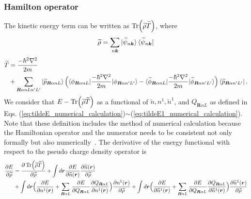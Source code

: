 \documentclass{article}
\begin{document}
\subsubsection{Hamilton operator}
The kinetic energy term can be written as $\Tr (\widetilde{\rho} \widetilde{T})$, where
\begin{align}
  \widetilde{\rho} = \sum_{n\bm{k}} \ket{\widetilde{\psi}_{n\bm{k}}} \bra{\widetilde{\psi}_{n\bm{k}}}
\end{align}
\begin{align}
  \widetilde{T} 
  &=
  \frac{-\hbar^2 \nabla^2}{2m} 
  \nonumber
  \\&+ 
  \sum_{\bm{R}\alpha nL n'L'}
  \ket{\widetilde{p}_{\bm{R}\alpha nL}}
  \Bigl(
    \braket{\phi_{\bm{R}\alpha nL} | \frac{-\hbar^2 \nabla^2}{2m} | \phi_{\bm{R}\alpha n'L'}} 
    - 
    \braket{\widetilde{\phi}_{\bm{R}\alpha nL} | \frac{-\hbar^2 \nabla^2}{2m} | \widetilde{\phi}_{\bm{R}\alpha n'L'}}
  \Bigr)
  \bra{\widetilde{p}_{\bm{R}\alpha n'L'}}.
\end{align}
We consider that $E - \Tr (\widetilde{\rho} \widetilde{T})$ as a functional of $\widetilde{n}, n^1, \widetilde{n}^1$, and $Q_{\bm{R}\alpha L}$ as defined in 
Eqs. (\ref{eq:tildeE_numerical_calculation})$\sim$(\ref{eq:tildeE1_numerical_calculation}).
Note that these definition includes the method of numerical calculation because the Hamiltonian operator and the numerator needs to be consistent not only formally but also numerically~\cite{PhysRevB.50.17953}. The derivative of the energy functional with respect to the pseudo charge density operator is 
\begin{align}
  \frac{\partial E}{\partial \widetilde{\rho}}
  &=
  \frac{\partial \Tr(\widetilde{\rho}\widetilde{T})}{\partial \widetilde{\rho}}
  +
  \int d\bm{r} 
  \frac{\partial E}{\partial \widetilde{n}(\bm{r})}
  \frac{\partial \widetilde{n}(\bm{r})}{\partial \widetilde{\rho}}
  \nonumber
  \\&
  +
  \int d\bm{r} 
  \Bigl(
    \frac{\partial E}{\partial n^1(\bm{r})}
    + 
    \sum_{\bm{R}\alpha L} \frac{\partial E}{\partial Q_{\bm{R}\alpha L}} 
    \frac{\partial Q_{\bm{R}\alpha L}}{\partial n^1(\bm{r})}
  \Bigr)
  \frac{\partial {n}^1(\bm{r})}{\partial \widetilde{\rho}}
  + 
  \int d\bm{r} 
  \Bigl(
    \frac{\partial E}{\partial \widetilde{n}^1(\bm{r})}
    + 
    \sum_{\bm{R}\alpha L} \frac{\partial E}{\partial Q_{\bm{R}\alpha L}} 
    \frac{\partial Q_{\bm{R}\alpha L}}{\partial \widetilde{n}^1(\bm{r})}
  \Bigr)
  \frac{\partial \widetilde{n}^1(\bm{r})}{\partial \widetilde{\rho}}
\end{align}
\end{document}
